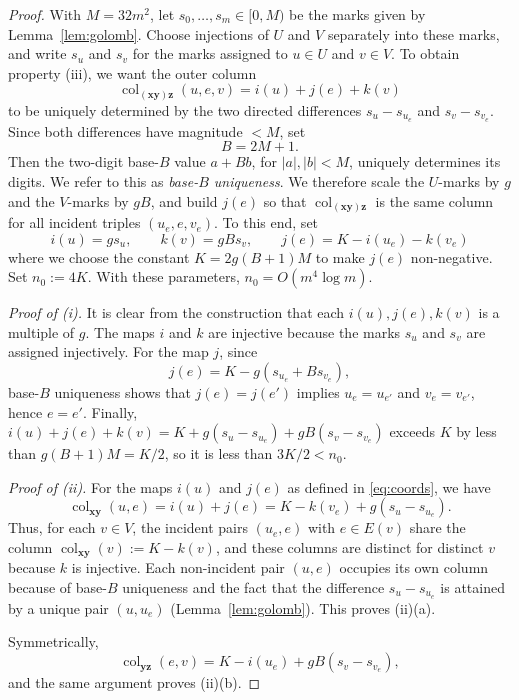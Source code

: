 \documentclass[11pt]{article}
\theoremstyle{definition}
\theoremstyle{remark}
\newcommand{\col}{\operatorname{col}}
\newcommand{\vv}[1]{\mathbf{#1}}
\begin{document}
\begin{proof}
With $M=32m^2$, let $s_0,\ldots,s_m\in[0,M)$ be the marks given by Lemma~\ref{lem:golomb}. Choose injections of $U$ and $V$ separately into these marks,
and write $s_u$ and $s_v$ for the marks assigned to $u\in U$ and $v\in V$. To obtain property (iii), we want the outer
column
\[
\col_{(\vv{x}\vv{y})\vv{z}}(u,e,v)=i(u)+j(e)+k(v)
\]
to be uniquely determined by the two directed differences $s_u-s_{u_e}$ and $s_v-s_{v_e}$. Since both differences have magnitude $<M$, set
\[
B=2M+1.
\]
Then the two-digit base-$B$ value $a+Bb$, for $|a|,|b|<M$, uniquely determines its digits. We refer to this as \emph{base-$B$ uniqueness}.
We therefore scale the $U$-marks by $g$ and the $V$-marks by $gB$, and build $j(e)$ so that $\col_{(\vv{x}\vv{y})\vv{z}}$ is the same column
for all incident triples $(u_e,e,v_e)$. To this end, set
\begin{equation}
	\label{eq:coords}
	i(u)=gs_u,\qquad k(v)=gBs_v,\qquad j(e)=K-i(u_e)-k(v_e)
\end{equation}
where we choose the constant $K=2g(B+1)M$ to make $j(e)$ non-negative. Set $n_0:=4K$. With these
parameters, $n_0=O(m^4\log m)$.

\emph{Proof of (i).} It is clear from the construction that each $i(u), j(e), k(v)$ is a multiple of $g$. The maps $i$ and $k$ are injective because the marks $s_u$ and $s_v$ are assigned injectively. For the map $j$, since
\[
j(e)=K-g(s_{u_e}+Bs_{v_e}),
\]
base-$B$ uniqueness shows that $j(e)=j(e')$ implies $u_e=u_{e'}$ and $v_e=v_{e'}$, hence $e=e'$.
Finally, $i(u)+j(e)+k(v)=K+g(s_u-s_{u_e})+gB(s_v-s_{v_e})$ exceeds $K$ by less than $g(B+1)M=K/2$, so it is less than $3K/2<n_0$.

\emph{Proof of (ii).} For the maps $i(u)$ and $j(e)$ as defined in \eqref{eq:coords}, we have
\begin{equation}
\label{eq:left-col}
 \col_{\vv{xy}}(u,e)= i(u) + j(e) = K-k(v_e)+g(s_u-s_{u_e}).
\end{equation}
Thus, for each $v\in V$, the incident pairs $(u_e,e)$ with $e\in E(v)$ share the column $\col_{\vv{xy}}(v):=K-k(v)$, and these columns
are distinct for distinct $v$ because $k$ is injective. Each non-incident pair $(u,e)$ occupies its own
column because of base-$B$ uniqueness and the fact that the difference $s_u-s_{u_e}$ is attained by a unique pair $(u, u_e)$
(Lemma~\ref{lem:golomb}). This proves (ii)(a).

Symmetrically,
\begin{equation}
\label{eq:right-col}
 \col_{\vv{yz}}(e,v)=K-i(u_e)+gB(s_v-s_{v_e}),
\end{equation}
and the same argument proves (ii)(b).


\end{proof}
\end{document}
